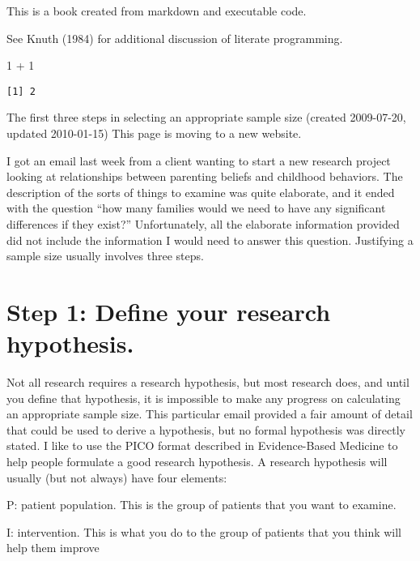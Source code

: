 \documentclass[
  letterpaper,
  DIV=11,
  numbers=noendperiod]{scrreprt}
\newenvironment{Shaded}{\begin{snugshade}}{\end{snugshade}}
\newcommand{\DecValTok}[1]{\textcolor[rgb]{0.68,0.00,0.00}{#1}}
\newcommand{\SpecialCharTok}[1]{\textcolor[rgb]{0.37,0.37,0.37}{#1}}
\begin{document}
This is a book created from markdown and executable code.

See Knuth (1984) for additional discussion of literate programming.

\begin{Shaded}
\begin{Highlighting}[]
\DecValTok{1} \SpecialCharTok{+} \DecValTok{1}
\end{Highlighting}
\end{Shaded}

\begin{verbatim}
[1] 2
\end{verbatim}

The first three steps in selecting an appropriate sample size (created
2009-07-20, updated 2010-01-15) This page is moving to a new website.

I got an email last week from a client wanting to start a new research
project looking at relationships between parenting beliefs and childhood
behaviors. The description of the sorts of things to examine was quite
elaborate, and it ended with the question ``how many families would we
need to have any significant differences if they exist?'' Unfortunately,
all the elaborate information provided did not include the information I
would need to answer this question. Justifying a sample size usually
involves three steps.

\hypertarget{step-1-define-your-research-hypothesis.}{%
\section{Step 1: Define your research
hypothesis.}\label{step-1-define-your-research-hypothesis.}}

Not all research requires a research hypothesis, but most research does,
and until you define that hypothesis, it is impossible to make any
progress on calculating an appropriate sample size. This particular
email provided a fair amount of detail that could be used to derive a
hypothesis, but no formal hypothesis was directly stated. I like to use
the PICO format described in Evidence-Based Medicine to help people
formulate a good research hypothesis. A research hypothesis will usually
(but not always) have four elements:

P: patient population. This is the group of patients that you want to
examine.

I: intervention. This is what you do to the group of patients that you
think will help them improve
\end{document}

